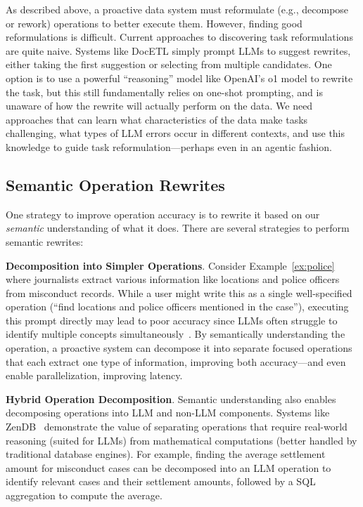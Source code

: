 As described above, a proactive data system
must reformulate (e.g., decompose or rework) operations to better execute them. However, finding good reformulations is difficult. Current approaches to discovering task reformulations are quite naive. Systems like DocETL simply prompt LLMs to suggest rewrites, either taking the first suggestion or selecting from multiple candidates. One option is to use a powerful ``reasoning'' model like OpenAI's o1 model to rewrite the task, but this still fundamentally relies on one-shot prompting, and is unaware of how the rewrite will actually perform on the data. We need approaches that can learn what characteristics of the data make tasks challenging, what types of LLM errors occur in different contexts, and use this knowledge to guide task reformulation---perhaps even in an agentic fashion.



















\subsection{Semantic Operation Rewrites}

One strategy to improve operation accuracy is to rewrite it based on our {\em semantic} understanding of what it does. There are several strategies to perform semantic rewrites:

\textbf{Decomposition into Simpler Operations}. Consider Example~\ref{ex:police} where journalists extract various information like locations and police officers from misconduct records. While a user might write this as a single well-specified operation (``find locations and police officers mentioned in the case''), executing this prompt directly may lead to poor accuracy since LLMs often struggle to identify multiple concepts simultaneously~\cite{shankar2024docetl}. By semantically understanding the operation, a proactive system can decompose it into separate focused operations that each extract one type of information, improving both accuracy---and even enable parallelization, improving latency.

\textbf{Hybrid Operation Decomposition}. Semantic understanding also enables decomposing operations into LLM and non-LLM components. Systems like ZenDB~\cite{lin2024towards} demonstrate the value of separating operations that require real-world reasoning (suited for LLMs) from mathematical computations (better handled by traditional database engines). For example, finding the average settlement amount for misconduct cases can be decomposed into an LLM operation to identify relevant cases and their settlement amounts, followed by a SQL aggregation to compute the average. 

